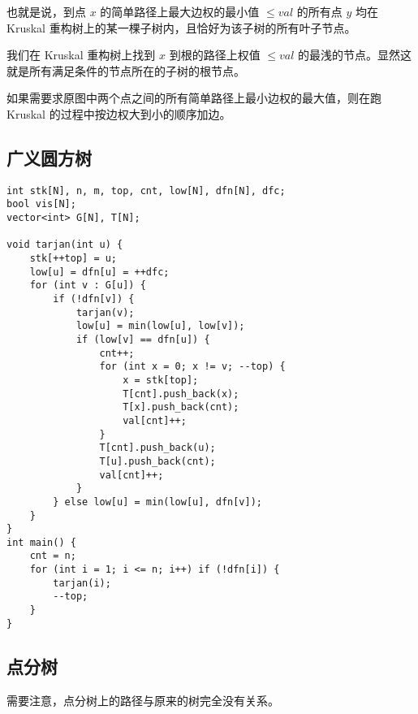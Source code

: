 \documentclass[a4paper]{article}
\begin{document}
也就是说，到点 $x$ 的简单路径上最大边权的最小值 $\leq val$ 的所有点 $y$ 均在 Kruskal 重构树上的某一棵子树内，且恰好为该子树的所有叶子节点。

我们在 Kruskal 重构树上找到 $x$ 到根的路径上权值 $\leq val$ 的最浅的节点。显然这就是所有满足条件的节点所在的子树的根节点。

如果需要求原图中两个点之间的所有简单路径上最小边权的最大值，则在跑 Kruskal 的过程中按边权大到小的顺序加边。

\subsection{广义圆方树}
\begin{lstlisting}
int stk[N], n, m, top, cnt, low[N], dfn[N], dfc;
bool vis[N];
vector<int> G[N], T[N];

void tarjan(int u) {
    stk[++top] = u;
    low[u] = dfn[u] = ++dfc;
    for (int v : G[u]) {
        if (!dfn[v]) {
            tarjan(v);
            low[u] = min(low[u], low[v]);
            if (low[v] == dfn[u]) {
                cnt++;
                for (int x = 0; x != v; --top) {
                    x = stk[top];
                    T[cnt].push_back(x);
                    T[x].push_back(cnt);
                    val[cnt]++;
                }
                T[cnt].push_back(u);
                T[u].push_back(cnt);
                val[cnt]++;
            }
        } else low[u] = min(low[u], dfn[v]);
    }
}
int main() {
    cnt = n;
    for (int i = 1; i <= n; i++) if (!dfn[i]) {
        tarjan(i);
        --top;
    }
}
\end{lstlisting}

\subsection{点分树}

需要注意，点分树上的路径与原来的树完全没有关系。
\end{document}
